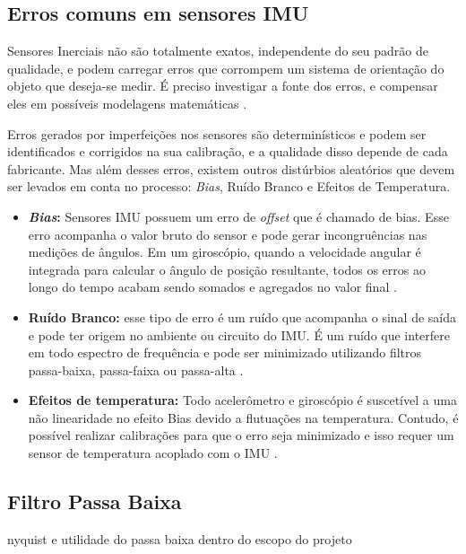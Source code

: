 \subsection{Erros comuns em sensores IMU}

Sensores Inerciais não são totalmente exatos, independente do seu padrão de qualidade, e podem carregar erros que corrompem um sistema de orientação do objeto que deseja-se medir. É preciso investigar a fonte dos erros, e compensar eles em possíveis modelagens matemáticas \cite{diss:FabioAUV}.

Erros gerados por imperfeições nos sensores são determinísticos e podem ser identificados e corrigidos na sua calibração, e a qualidade disso depende de cada fabricante. Mas além desses erros, existem outros distúrbios aleatórios que devem ser levados em conta no processo: \textit{Bias}, Ruído Branco e Efeitos de Temperatura.

\begin{itemize}
	\item \textbf{\textit{Bias}:} Sensores IMU possuem um erro de \textit{offset} que é chamado de bias. Esse erro acompanha o valor bruto do sensor e pode gerar incongruências nas medições de ângulos. Em um giroscópio, quando a velocidade angular é integrada para calcular o ângulo de posição resultante, todos os erros ao longo do tempo acabam sendo somados e agregados no valor final \cite{manual:cambimu}. 
	
	\item \textbf{Ruído Branco:} esse tipo de erro é um ruído que acompanha o sinal de saída e pode ter origem no ambiente ou circuito do IMU. É um ruído que interfere em todo  espectro de frequência e pode ser minimizado utilizando filtros passa-baixa, passa-faixa ou passa-alta \cite{diss:FabioAUV}.
	
	\item \textbf{Efeitos de temperatura:} Todo acelerômetro e giroscópio é suscetível a uma não linearidade no efeito Bias devido a flutuações na temperatura. Contudo, é possível realizar calibrações para que o erro seja minimizado e isso requer um sensor de temperatura acoplado com o IMU \cite{manual:cambimu}. 
\end{itemize}

\subsection{Filtro Passa Baixa}

nyquist e utilidade do passa baixa dentro do escopo do projeto

